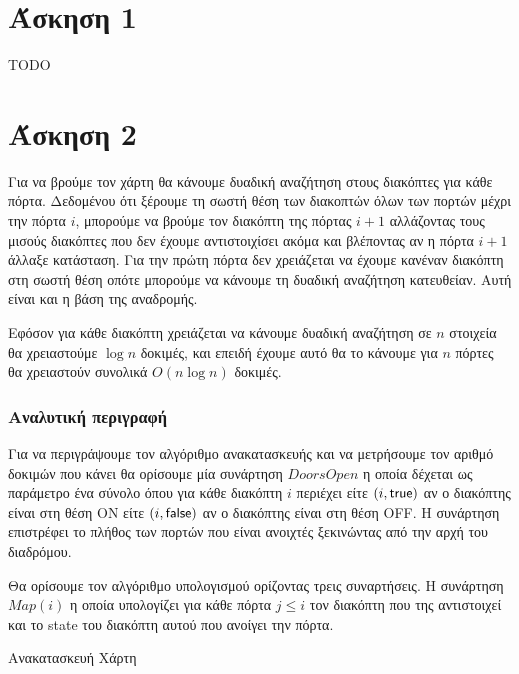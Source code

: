 \section{Άσκηση 1}

TODO

\section{Άσκηση 2}

Για να βρούμε τον χάρτη θα κάνουμε δυαδική αναζήτηση στους διακόπτες για κάθε
πόρτα. Δεδομένου ότι ξέρουμε τη σωστή θέση των διακοπτών όλων των πορτών μέχρι
την πόρτα $i$, μπορούμε να βρούμε τον διακόπτη της πόρτας $i + 1$ αλλάζοντας
τους μισούς διακόπτες που δεν έχουμε αντιστοιχίσει ακόμα και βλέποντας αν η
πόρτα $i + 1$ άλλαξε κατάσταση. Για την πρώτη πόρτα δεν χρειάζεται να έχουμε
κανέναν διακόπτη στη σωστή θέση οπότε μπορούμε να κάνουμε τη δυαδική αναζήτηση
κατευθείαν. Αυτή είναι και η βάση της αναδρομής.

Εφόσον για κάθε διακόπτη χρειάζεται να κάνουμε δυαδική αναζήτηση σε $n$
στοιχεία θα χρειαστούμε $\log{}n$ δοκιμές, και επειδή έχουμε αυτό θα το κάνουμε
για $n$ πόρτες θα χρειαστούν συνολικά $O(n\log{}n)$ δοκιμές.

\subsubsection{Αναλυτική περιγραφή}

Για να περιγράψουμε τον αλγόριθμο ανακατασκευής και να μετρήσουμε τον αριθμό
δοκιμών που κάνει θα ορίσουμε μία συνάρτηση $DoorsOpen$ η οποία δέχεται ως
παράμετρο ένα σύνολο όπου για κάθε διακόπτη $i$ περιέχει είτε $(i, \mathsf{true})$ αν ο
διακόπτης είναι στη θέση ON είτε $(i, \mathsf{false})$ αν ο διακόπτης είναι στη θέση
OFF. Η συνάρτηση επιστρέφει το πλήθος των πορτών που είναι ανοιχτές ξεκινώντας
από την αρχή του διαδρόμου.

Θα ορίσουμε τον αλγόριθμο υπολογισμού ορίζοντας τρεις συναρτήσεις. Η συνάρτηση
$Map(i)$ η οποία υπολογίζει για κάθε πόρτα $j \leq i$  τον διακόπτη που της
αντιστοιχεί και το state του διακόπτη αυτού που ανοίγει την πόρτα.

\begin{algorithm}[H]
  \caption{\label{alg:ex2-findswitch}Ανακατασκευή Χάρτη}
    \begin{algorithmic}[1]
          \State\Return{$\emptyset$}
        \Else
          \State{}
        \EndIf
      \EndFunction
    \end{algorithmic}
\end{algorithm}

